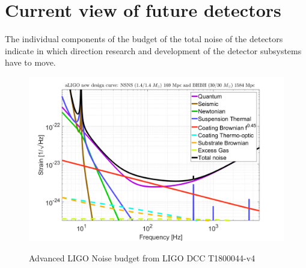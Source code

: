 \section{Current view of future detectors}

The individual components of the budget of the total noise of the detectors indicate in which direction research and development of the detector subsystems have to move.

\begin{figure}[h]
\includegraphics[width=\textwidth]{aLIGO_newDesign.png}
\label{fig:ALIGOSensitivity}
\caption{Advanced LIGO Noise budget from LIGO DCC T1800044-v4}
\end{figure}



